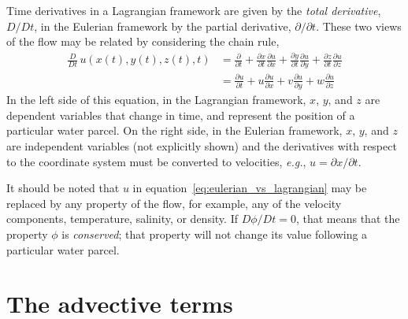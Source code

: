 \documentclass[11pt]{report}
\numberwithin{equation}{section}
\begin{document}
Time derivatives in a Lagrangian framework are given by the {\it total derivative}, $D/Dt$, in the Eulerian framework by the partial derivative, $\partial/\partial t$.  These two views of the flow may be related by considering the chain rule,
\begin{equation}
  \label{eq:eulerian_vs_lagrangian}
  \begin{split}
    \frac{D}{Dt}\,u(x(t), y(t), z(t), t) &= \frac{\partial}{\partial t} 
                    + \frac{\partial x}{\partial t} \frac{\partial u}{\partial x} 
                    + \frac{\partial y}{\partial t} \frac{\partial u}{\partial y} 
                    + \frac{\partial z}{\partial t} \frac{\partial u}{\partial z} \\
                     &= \frac{\partial u}{\partial t} 
                    + u \frac{\partial u}{\partial x} 
                    + v \frac{\partial u}{\partial y} 
                    + w \frac{\partial u}{\partial z}
  \end{split}
\end{equation}
In the left side of this equation, in the Lagrangian framework, $x$, $y$, and $z$ are dependent variables that change in time, and represent the position of a particular water parcel.  On the right side, in the Eulerian framework, $x$, $y$, and $z$ are independent variables (not explicitly shown) and the derivatives with respect to the coordinate system must be converted to velocities, \emph{e.g.}, $u = \partial x/\partial t$.  

It should be noted that $u$ in equation~\ref{eq:eulerian_vs_lagrangian} may be replaced by any property of the flow, for example, any of the velocity components, temperature, salinity, or density.  If $D\phi/Dt=0$, that means that the property $\phi$ is {\it conserved}; that property will not change its value following a particular water parcel.  

\section{The advective terms} 
\label{sec:adv}
\end{document}
